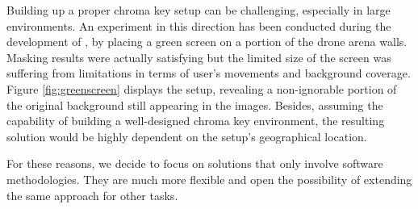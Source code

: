 Building up a proper chroma key setup can be challenging, especially in large environments. An experiment in this direction has been conducted during the development of \cite{mantegazza2019visionbased}, by placing a green screen on a portion of the drone arena walls. Masking results were actually satisfying but the limited size of the screen was suffering from limitations in terms of user's movements and background coverage. Figure \ref{fig:greenscreen} displays the setup, revealing a non-ignorable portion of the original background still appearing in the images. Besides, assuming the capability of building a well-designed chroma key environment, the resulting solution would be highly dependent on the setup's geographical location.

For these reasons, we decide to focus on solutions that only involve software methodologies. They are much more flexible and open the possibility of extending the same approach for other tasks.

